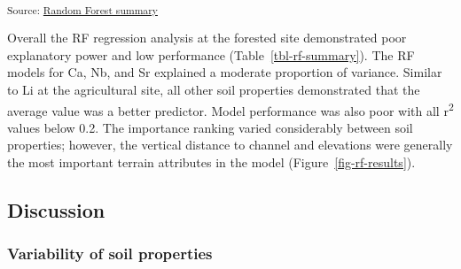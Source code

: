\documentclass[
  number]{elsarticle}
\begin{document}
\textsubscript{Source:
\href{https://alex-koiter.github.io/terrain-attributes/notebooks/RF_summary.qmd.html\#cell-fig-rf-results}{Random
Forest summary}}

Overall the RF regression analysis at the forested site demonstrated
poor explanatory power and low performance (Table~\ref{tbl-rf-summary}).
The RF models for Ca, Nb, and Sr explained a moderate proportion of
variance. Similar to Li at the agricultural site, all other soil
properties demonstrated that the average value was a better predictor.
Model performance was also poor with all r\textsuperscript{2} values
below 0.2. The importance ranking varied considerably between soil
properties; however, the vertical distance to channel and elevations
were generally the most important terrain attributes in the model
(Figure~\ref{fig-rf-results}).

\subsection{Discussion}\label{discussion}

\subsubsection{Variability of soil
properties}\label{variability-of-soil-properties}
\end{document}
